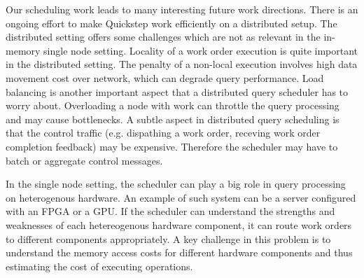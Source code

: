 Our scheduling work leads to many interesting future work directions.
There is an ongoing effort to make Quickstep work efficiently on a distributed setup. 
The distributed setting offers some challenges which are not as relevant in the in-memory single node setting.
Locality of a work order execution is quite important in the distributed setting.
The penalty of a non-local execution involves high data movement cost over network, which can degrade query performance.
Load balancing is another important aspect that a distributed query scheduler has to worry about.
Overloading a node with work can throttle the query processing and may cause bottlenecks.
A subtle aspect in distributed query scheduling is that the control traffic (e.g. dispathing a work order, receving work order completion feedback) may be expensive.
Therefore the scheduler may have to batch or aggregate control messages.

In the single node setting, the scheduler can play a big role in query processing on heterogenous hardware.
An example of such system can be a server configured with an FPGA or a GPU.
If the scheduler can understand the strengths and weaknesses of each hetereogenous hardware component, it can route work orders to different components appropriately. 
A key challenge in this problem is to understand the memory access costs for different hardware components and thus estimating the cost of executing operations.